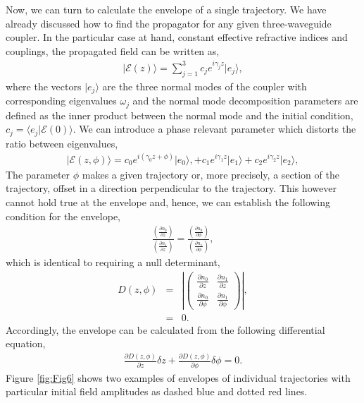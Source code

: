 \documentclass[9pt,twocolumn,twoside]{osajnl}
\begin{document}
Now, we can turn to calculate the envelope of a single trajectory. 
We have already discussed how to find the propagator for any given three-waveguide coupler. 
In the particular case at hand, constant effective refractive indices and couplings, the propagated field can be written as, 
\begin{eqnarray}
	\vert \mathcal{E}(z) \rangle =  \sum_{j=1}^{3} c_j e^{i \gamma_j z} \vert e_j \rangle,
\end{eqnarray}
where the vectors $\vert e_j \rangle$ are the three normal modes of the coupler with corresponding eigenvalues $\omega_j$ and the normal mode decomposition parameters are defined as the inner product between the normal mode and the initial condition,  $c_{j} = \langle e_{j} \vert \mathcal{E}(0) \rangle$. 
We can introduce a phase relevant parameter which distorts the ratio between eigenvalues, 
\begin{eqnarray}
\vert \mathcal{E}(z, \phi) \rangle = c_0 e^{i \left( \gamma_0 z + \phi \right) } \vert e_0 \rangle, + c_1 e^{i \gamma_1 z} \vert e_1 \rangle + c_2 e^{i \gamma_2 z} \vert e_2 \rangle,
\end{eqnarray}
The parameter $\phi$ makes a given trajectory or, more precisely, a section of the trajectory, offset in a direction perpendicular to the trajectory.
This however cannot hold true at the envelope and, hence, we can establish the following condition for the envelope,
\begin{eqnarray}
	\frac{ (\frac{\partial n_0}{\partial z}) }{ (\frac{\partial n_1}{\partial z}) } = \frac{( \frac{\partial n_0}{\partial \phi})}{(\frac{\partial n_1}{\partial \phi}) } ,
\end{eqnarray}
which is identical to requiring a null determinant,
\begin{eqnarray}
	D(z, \phi) &=& \left\vert \left(  \begin{array}{cc} 
		\frac{\partial n_0}{\partial z} & \frac{\partial n_1}{\partial z} \\
		\frac{\partial n_0}{\partial \phi} & \frac{\partial n_1}{\partial \phi} 
	\end{array} \right) \right\vert, \\
	&=& 0.
\end{eqnarray}
Accordingly, the envelope can be calculated from the following differential equation,
\begin{eqnarray}
	\frac{\partial D(z,\phi)}{\partial z} \delta z +
	\frac{\partial D(z,\phi)}{\partial \phi} \delta \phi = 0. \label{eq:EnvInd}
\end{eqnarray}
Figure \ref{fig:Fig6} shows two examples of envelopes of individual trajectories with particular initial field amplitudes as dashed blue and dotted red lines. 
\end{document}
